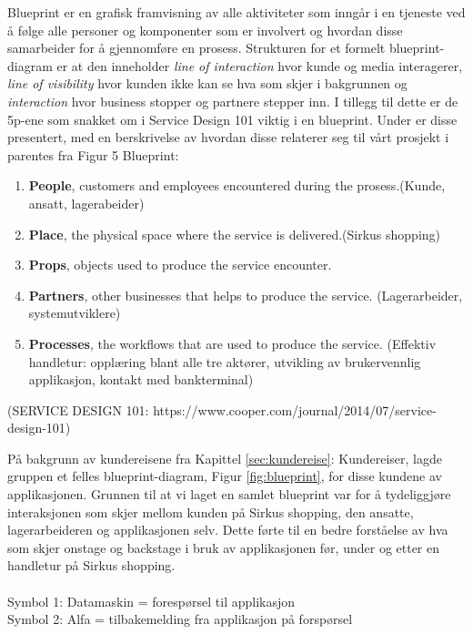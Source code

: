 Blueprint er en grafisk framvisning av alle aktiviteter som inngår i en tjeneste ved å følge alle personer og komponenter som er involvert og hvordan disse samarbeider for å gjennomføre en prosess\cite{servicedesign}.
Strukturen for et formelt blueprint-diagram er at den inneholder \textit{line of interaction} hvor kunde og media interagerer, \textit{line of visibility} hvor kunden ikke kan se hva som skjer i bakgrunnen og \textit{interaction} hvor business stopper og partnere stepper inn\cite{servicedesign}. I tillegg til dette er de 5p-ene som snakket om i Service Design 101 viktig i en blueprint\cite{servicedesign}. Under er disse presentert, med en berskrivelse av hvordan disse relaterer seg til vårt prosjekt i parentes fra Figur 5 Blueprint:
\begin{enumerate}
\item \textbf{People}, customers and employees encountered during the prosess.(Kunde, ansatt, lagerabeider)
\item \textbf{Place}, the physical space where the service is delivered.(Sirkus shopping)
\item \textbf{Props}, objects used to produce the service encounter.
\item \textbf{Partners}, other businesses that helps to produce the service. (Lagerarbeider, systemutviklere)
\item \textbf{Processes}, the workflows that are used to produce the service. (Effektiv handletur: opplæring blant alle tre aktører, utvikling av brukervennlig applikasjon, kontakt med bankterminal)
\end{enumerate} (SERVICE DESIGN 101: https://www.cooper.com/journal/2014/07/service-design-101)

\noindent På bakgrunn av kundereisene fra Kapittel \ref{sec:kundereise}: Kundereiser, lagde gruppen et felles blueprint-diagram, Figur \ref{fig:blueprint}, for disse kundene av applikasjonen. Grunnen til at vi laget en samlet blueprint var for å tydeliggjøre interaksjonen som skjer mellom kunden på Sirkus shopping, den ansatte, lagerarbeideren og applikasjonen selv. Dette førte til en bedre forståelse av hva som skjer onstage og backstage i bruk av applikasjonen før, under og etter en handletur på Sirkus shopping. 
\\\\
Symbol 1: Datamaskin = forespørsel til applikasjon\\
Symbol 2: Alfa = tilbakemelding fra applikasjon på forspørsel



